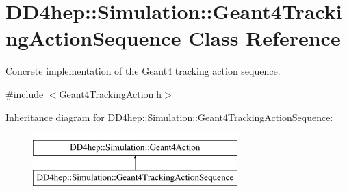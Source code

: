 \hypertarget{class_d_d4hep_1_1_simulation_1_1_geant4_tracking_action_sequence}{}\section{D\+D4hep\+:\+:Simulation\+:\+:Geant4\+Tracking\+Action\+Sequence Class Reference}
\label{class_d_d4hep_1_1_simulation_1_1_geant4_tracking_action_sequence}


Concrete implementation of the Geant4 tracking action sequence.  




{\ttfamily \#include $<$Geant4\+Tracking\+Action.\+h$>$}

Inheritance diagram for D\+D4hep\+:\+:Simulation\+:\+:Geant4\+Tracking\+Action\+Sequence\+:\begin{figure}[H]
\begin{center}
\leavevmode
\includegraphics[height=2.000000cm]{class_d_d4hep_1_1_simulation_1_1_geant4_tracking_action_sequence}
\end{center}
\end{figure}
